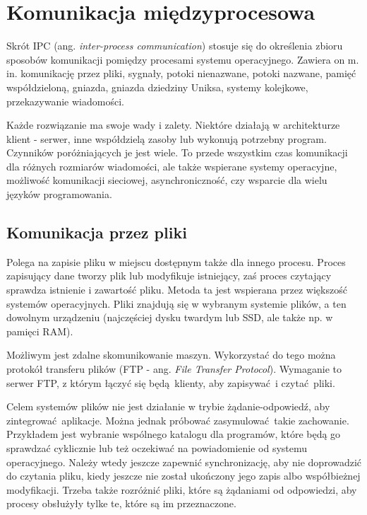 \chapter{Komunikacja międzyprocesowa}

Skrót IPC (ang. \textit{inter-process communication}) stosuje się do określenia zbioru sposobów komunikacji pomiędzy procesami systemu operacyjnego. Zawiera on m. in. komunikację przez pliki, sygnały, potoki nienazwane, potoki nazwane, pamięć współdzieloną, gniazda, gniazda dziedziny Uniksa, systemy kolejkowe, przekazywanie wiadomości.

Każde rozwiązanie ma swoje wady i zalety. Niektóre działają w architekturze klient - serwer, inne współdzielą zasoby lub wykonują potrzebny program. Czynników poróżniających je jest wiele. To przede wszystkim czas komunikacji dla różnych rozmiarów wiadomości, ale także wspierane systemy operacyjne, możliwość komunikacji sieciowej, asynchroniczność, czy wsparcie dla wielu języków programowania.


\section{Komunikacja przez pliki}

Polega na zapisie pliku w miejscu dostępnym także dla innego procesu. Proces zapisujący dane tworzy plik lub modyfikuje istniejący, zaś proces czytający sprawdza istnienie i zawartość pliku. Metoda ta jest wspierana przez większość systemów operacyjnych. Pliki znajdują się w wybranym systemie plików, a ten dowolnym urządzeniu (najczęściej dysku twardym lub SSD, ale także np. w pamięci RAM).

Możliwym jest zdalne skomunikowanie maszyn. Wykorzystać do tego można protokół transferu plików (FTP - ang. \textit{File Transfer Protocol}). Wymaganie to serwer FTP, z którym łączyć się będą klienty, aby zapisywać i czytać pliki.

Celem systemów plików nie jest działanie w trybie żądanie-odpowiedź, aby zintegrować aplikacje. Można jednak próbować zasymulować takie zachowanie. Przykładem jest wybranie wspólnego katalogu dla programów, które będą go sprawdzać cyklicznie lub też oczekiwać na powiadomienie od systemu operacyjnego. Należy wtedy jeszcze zapewnić synchronizację, aby nie doprowadzić do czytania pliku, kiedy jeszcze nie został ukończony jego zapis albo współbieżnej modyfikacji. Trzeba także rozróżnić pliki, które są żądaniami od odpowiedzi, aby procesy obsłużyły tylke te, które są im przeznaczone.



